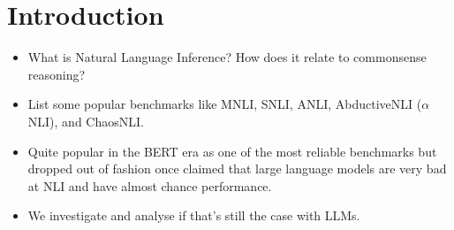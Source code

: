 \section{Introduction}


\begin{itemize}
  \item What is Natural Language Inference? How does it relate to commonsense reasoning?
  \item List some popular benchmarks like MNLI, SNLI, ANLI, AbductiveNLI ($\alpha$NLI), and ChaosNLI.
  \item Quite popular in the BERT era as one of the most reliable benchmarks but dropped out of fashion once \citet{brown2020languagemodelsfewshotlearners} claimed that large language models are very bad at NLI and have almost chance performance.
  \item We investigate and analyse if that's still the case with LLMs.
\end{itemize}

